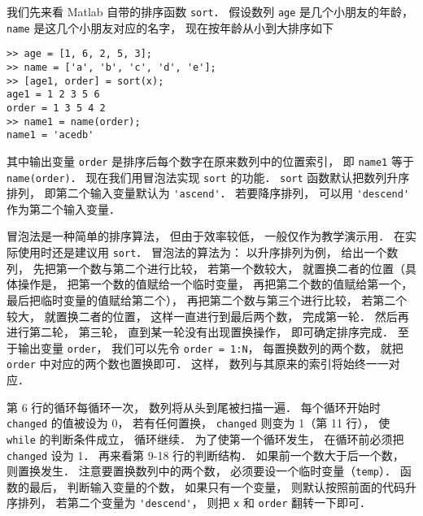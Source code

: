 
我们先来看 Matlab 自带的排序函数 \lstinline|sort|． 假设数列 \lstinline|age| 是几个小朋友的年龄， \lstinline|name| 是这几个小朋友对应的名字， 现在按年龄从小到大排序如下
\begin{lstlisting}[language=matlabC]
>> age = [1, 6, 2, 5, 3];
>> name = ['a', 'b', 'c', 'd', 'e'];
>> [age1, order] = sort(x);
age1 = 1 2 3 5 6
order = 1 3 5 4 2
>> name1 = name(order);
name1 = 'acedb'
\end{lstlisting}
其中输出变量 \lstinline|order| 是排序后每个数字在原来数列中的位置索引， 即 \lstinline|name1| 等于 \lstinline|name(order)|． 现在我们用冒泡法实现 \lstinline|sort| 的功能． \lstinline|sort| 函数默认把数列升序排列， 即第二个输入变量默认为 \lstinline|'ascend'|． 若要降序排列， 可以用 \lstinline|'descend'| 作为第二个输入变量．

冒泡法是一种简单的排序算法， 但由于效率较低， 一般仅作为教学演示用． 在实际使用时还是建议用 \lstinline|sort|． 冒泡法的算法为： 以升序排列为例， 给出一个数列， 先把第一个数与第二个进行比较， 若第一个数较大， 就置换二者的位置（具体操作是， 把第一个数的值赋给一个临时变量， 再把第二个数的值赋给第一个， 最后把临时变量的值赋给第二个）， 再把第二个数与第三个进行比较， 若第二个较大， 就置换二者的位置， 这样一直进行到最后两个数， 完成第一轮． 然后再进行第二轮， 第三轮， 直到某一轮没有出现置换操作， 即可确定排序完成． 至于输出变量 \lstinline|order|， 我们可以先令 \lstinline|order = 1:N|， 每置换数列的两个数， 就把 \lstinline|order| 中对应的两个数也置换即可． 这样， 数列与其原来的索引将始终一一对应． 


第 6 行的循环每循环一次， 数列将从头到尾被扫描一遍． 每个循环开始时 \lstinline|changed| 的值被设为 0， 若有任何置换， \lstinline|changed| 则变为 1（第 11 行）， 使 \lstinline|while| 的判断条件成立， 循环继续． 为了使第一个循环发生， 在循环前必须把 \lstinline|changed| 设为 1． 再来看第 9-18 行的判断结构． 如果前一个数大于后一个数， 则置换发生． 注意要置换数列中的两个数， 必须要设一个临时变量（\lstinline|temp|）． 函数的最后， 判断输入变量的个数， 如果只有一个变量， 则默认按照前面的代码升序排列， 若第二个变量为 \lstinline|'descend'|， 则把 \lstinline|x| 和 \lstinline|order| 翻转一下即可．

